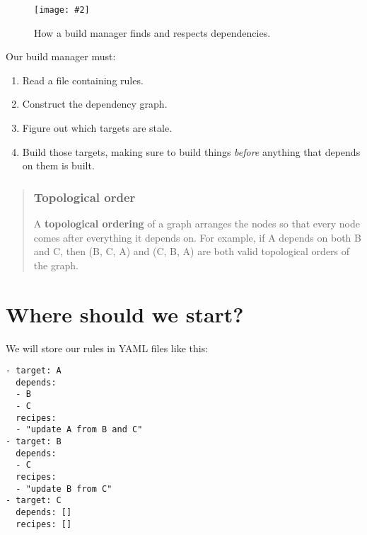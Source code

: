 \documentclass[krantzl]{krantz}
\newcommand{\figpdf}[4]{\begin{figure}%
\centering%
\texttt{[image: \#2]}%
\caption{#3}%
\label{#1}%
\end{figure}}
\newcommand{\glossref}[1]{\textbf{#1}}
\newenvironment{callout}{\savenotes\begin{tBox}\begin{quotation}\toggletrue{inbox}\renewcommand{\thempfootnote}{\arabic{footnote}}}{\end{quotation}\vspace{\baselineskip}\end{tBox}\togglefalse{inbox}\spewnotes}
\begin{document}
\figpdf{build-manager-dependencies}{./build-manager/dependencies.pdf}{How a build manager finds and respects dependencies.}{0.6}


Our build manager must:

\begin{enumerate}

\item 

Read a file containing rules.



\item 

Construct the dependency graph.



\item 

Figure out which targets are stale.



\item 

Build those targets,
    making sure to build things \emph{before} anything that depends on them is built.



\end{enumerate}

\begin{callout}


\subsubsection*{Topological order}


A \glossref{topological ordering} of a graph
arranges the nodes so that every node comes after everything it depends on.
For example,
if A depends on both B and C,
then (B, C, A) and (C, B, A) are both valid topological orders of the graph.

\end{callout}

\section{Where should we start?}\label{build-manager-start}


We will store our rules in YAML files like this:


\begin{lstlisting}[frame=tblr]
- target: A
  depends:
  - B
  - C
  recipes:
  - "update A from B and C"
- target: B
  depends:
  - C
  recipes:
  - "update B from C"
- target: C
  depends: []
  recipes: []
\end{lstlisting}
\end{document}
